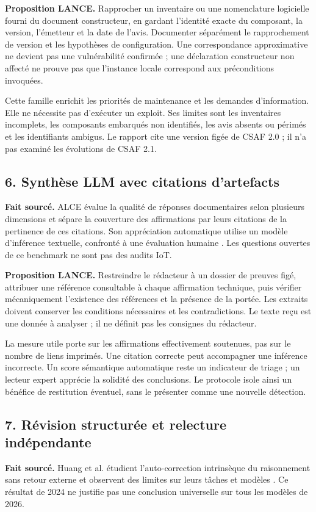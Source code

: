 \documentclass[11pt,a4paper]{article}
\begin{document}
\textbf{Proposition LANCE.} Rapprocher un inventaire ou une nomenclature logicielle fourni du document constructeur, en gardant l'identité exacte du composant, la version, l'émetteur et la date de l'avis. Documenter séparément le rapprochement de version et les hypothèses de configuration. Une correspondance approximative ne devient pas une vulnérabilité confirmée ; une déclaration constructeur non affecté ne prouve pas que l'instance locale correspond aux préconditions invoquées.

Cette famille enrichit les priorités de maintenance et les demandes d'information. Elle ne nécessite pas d'exécuter un exploit. Ses limites sont les inventaires incomplets, les composants embarqués non identifiés, les avis absents ou périmés et les identifiants ambigus. Le rapport cite une version figée de CSAF 2.0 ; il n'a pas examiné les évolutions de CSAF 2.1.

\subsection*{6. Synthèse LLM avec citations d'artefacts}
\textbf{Fait sourcé.} ALCE évalue la qualité de réponses documentaires selon plusieurs dimensions et sépare la couverture des affirmations par leurs citations de la pertinence de ces citations. Son appréciation automatique utilise un modèle d'inférence textuelle, confronté à une évaluation humaine \cite{alce}. Les questions ouvertes de ce benchmark ne sont pas des audits IoT.

\textbf{Proposition LANCE.} Restreindre le rédacteur à un dossier de preuves figé, attribuer une référence consultable à chaque affirmation technique, puis vérifier mécaniquement l'existence des références et la présence de la portée. Les extraits doivent conserver les conditions nécessaires et les contradictions. Le texte reçu est une donnée à analyser ; il ne définit pas les consignes du rédacteur.

La mesure utile porte sur les affirmations effectivement soutenues, pas sur le nombre de liens imprimés. Une citation correcte peut accompagner une inférence incorrecte. Un score sémantique automatique reste un indicateur de triage ; un lecteur expert apprécie la solidité des conclusions. Le protocole isole ainsi un bénéfice de restitution éventuel, sans le présenter comme une nouvelle détection.

\subsection*{7. Révision structurée et relecture indépendante}
\textbf{Fait sourcé.} Huang et al. étudient l'auto-correction intrinsèque du raisonnement sans retour externe et observent des limites sur leurs tâches et modèles \cite{selfcorrect}. Ce résultat de 2024 ne justifie pas une conclusion universelle sur tous les modèles de 2026.
\end{document}
